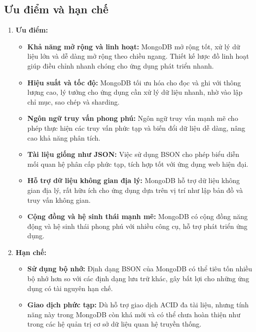 \subsection{Ưu điểm và hạn chế}
\begin{enumerate}
    \item []\textbf{Ưu điểm:}
    \begin{itemize}[left=0.5cm] 
        \item[-] \textbf{Khả năng mở rộng và linh hoạt:}  MongoDB mở rộng tốt, xử lý dữ liệu lớn và dễ dàng mở rộng theo chiều ngang. Thiết kế lược đồ linh hoạt giúp điều chỉnh nhanh chóng cho ứng dụng phát triển nhanh.
        
        \item[-] \textbf{Hiệu suất và tốc độ:} MongoDB tối ưu hóa cho đọc và ghi với thông lượng cao, lý tưởng cho ứng dụng cần xử lý dữ liệu nhanh, nhờ vào lập chỉ mục, sao chép và sharding.
        
        \item[-]\textbf{Ngôn ngữ truy vấn phong phú:} Ngôn ngữ truy vấn mạnh mẽ cho phép thực hiện các truy vấn phức tạp và biến đổi dữ liệu dễ dàng, nâng cao khả năng phân tích.
        
        \item[-] \textbf{Tài liệu giống như JSON:} Việc sử dụng BSON cho phép biểu diễn mối quan hệ phân cấp phức tạp, tích hợp tốt với ứng dụng web hiện đại.

        \item[-]\textbf{Hỗ trợ dữ liệu không gian địa lý:} MongoDB hỗ trợ dữ liệu không gian địa lý, rất hữu ích cho ứng dụng dựa trên vị trí như lập bản đồ và truy vấn không gian.

        \item[-]\textbf{Cộng đồng và hệ sinh thái mạnh mẽ:}  MongoDB có cộng đồng năng động và hệ sinh thái phong phú với nhiều công cụ, hỗ trợ phát triển ứng dụng.

    \end{itemize}
    \newpage

    \item [] \textbf{Hạn chế:}
    \begin{itemize}[left=0.5cm] 
        \item[-] \textbf{Sử dụng bộ nhớ:} Định dạng BSON của MongoDB có thể tiêu tốn nhiều bộ nhớ hơn so với các định dạng lưu trữ khác, gây bất lợi cho những ứng dụng có tài nguyên hạn chế.

        \item[-] \textbf{Giao dịch phức tạp:} Dù hỗ trợ giao dịch ACID đa tài liệu, nhưng tính năng này trong MongoDB còn khá mới và có thể chưa hoàn thiện như trong các hệ quản trị cơ sở dữ liệu quan hệ truyền thống.


\end{itemize}
\end{enumerate}

